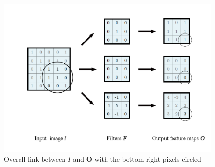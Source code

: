 \documentclass[10pt]{article}
\begin{document}

\begin{figure}[H]
  \centering
  \includegraphics[scale=0.35]{p1b.png}
  \caption{Overall link between $I$ and $\pmb{O}$ with the bottom right pixels circled}
\end{figure}
\end{document}
